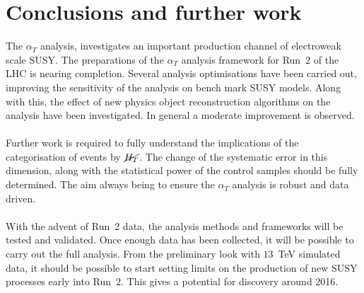 \section{Conclusions and further work}
\label{sec:conclusion}

The $\alpha_T$ analysis, investigates an important production channel of electroweak scale SUSY. The preparations of the $\alpha_T$ analysis framework for Run~2 of the LHC is nearing completion. Several analysis optimisations have been carried out, improving the sensitivity of the analysis on bench mark SUSY models. Along with this, the effect of new physics object reconstruction algorithms on the analysis have been investigated. In general a moderate improvement is observed.
\\\\
Further work is required to fully understand the implications of the categorisation of events by $\cancel{H_T}$. The change of the systematic error in this dimension, along with the statistical power of the control samples should be fully determined. The aim always being to ensure the $\alpha_T$ analysis is robust and data driven.
\\\\
With the advent of Run~2 data, the analysis methods and frameworks will be tested and validated. Once enough data has been collected, it will be possible to carry out the full analysis. From the preliminary look with $13$~TeV simulated data, it should be possible to start setting limits on the production of new SUSY processes early into Run~2. This gives a potential for discovery around 2016. 